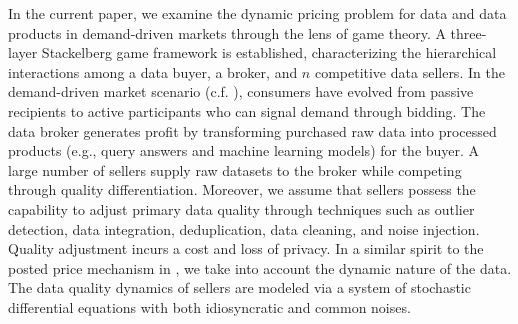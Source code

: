 \documentclass[11pt]{article}
\numberwithin{equation}{section}
\begin{document}
In the current paper, we examine the dynamic pricing problem for data and data products in demand-driven markets through the lens of game theory. A three-layer Stackelberg game framework is established, characterizing the hierarchical interactions among a data buyer, a broker, and $n$ competitive data sellers. In the demand-driven market scenario (c.f. \cite{H24}), consumers have evolved from passive recipients to active participants who can signal demand through bidding.  The data broker generates profit by transforming purchased raw data into processed products (e.g., query answers and machine learning models) for the buyer. A large number of sellers supply raw datasets to the broker  while competing through quality differentiation. Moreover, we assume that sellers possess the capability to adjust primary data quality through techniques such as outlier detection, data integration, deduplication, data cleaning, and noise injection. Quality adjustment incurs a cost and loss of privacy. In a similar spirit to the posted price mechanism in \cite{BL24}, we take into account the dynamic nature of the data. The data quality dynamics of sellers are modeled via a system of stochastic differential equations with both idiosyncratic and common noises. %
\end{document}
